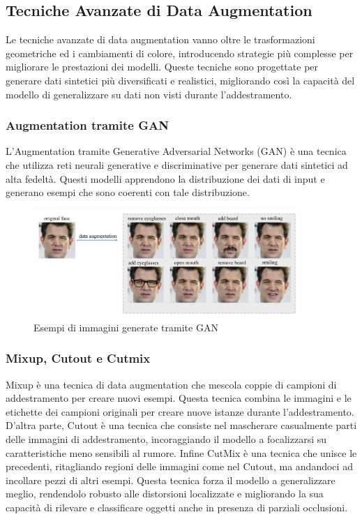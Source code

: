 \newpage

\subsection{Tecniche Avanzate di Data Augmentation}
Le tecniche avanzate di data augmentation vanno oltre le trasformazioni geometriche ed i cambiamenti di colore, introducendo strategie più complesse per migliorare le prestazioni dei modelli. Queste tecniche sono progettate per generare dati sintetici più diversificati e realistici, migliorando così la capacità del modello di generalizzare su dati non visti durante l'addestramento.

\subsubsection{Augmentation tramite GAN}
L'Augmentation tramite Generative Adversarial Networks (GAN) è una tecnica che utilizza reti neurali generative e discriminative per generare dati sintetici ad alta fedeltà. Questi modelli apprendono la distribuzione dei dati di input e generano esempi che sono coerenti con tale distribuzione. 

\vspace{0.5cm}

\begin{figure}[ht]
    \centering
    \includegraphics[width=0.9\textwidth]{files/capitoli/3-data-augmentation/assets/gan-augmentation.png}
    \caption{\label{fig:gan-augmentatione}Esempi di immagini generate tramite GAN\cite{37}}
\end{figure}

\newpage

\subsubsection{Mixup, Cutout e Cutmix}
Mixup è una tecnica di data augmentation che mescola coppie di campioni di addestramento per creare nuovi esempi. Questa tecnica combina le immagini e le etichette dei campioni originali per creare nuove istanze durante l'addestramento. D'altra parte, Cutout è una tecnica che consiste nel mascherare casualmente parti delle immagini di addestramento, incoraggiando il modello a focalizzarsi su caratteristiche meno sensibili al rumore. Infine CutMix è una tecnica che unisce le precedenti, ritagliando regioni delle immagini come nel Cutout, ma andandoci ad incollare pezzi di altri esempi. Questa tecnica forza il modello a generalizzare meglio, rendendolo robusto alle distorsioni localizzate e migliorando la sua capacità di rilevare e classificare oggetti anche in presenza di parziali occlusioni.

